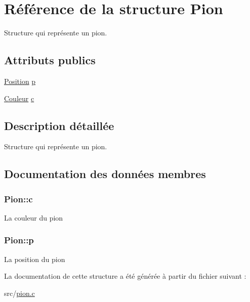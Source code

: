 \hypertarget{structPion}{\section{\-Référence de la structure \-Pion}
\label{structPion}
}


\-Structure qui représente un pion.  


\subsection*{\-Attributs publics}
\begin{DoxyCompactItemize}
\item 
\hyperlink{structPosition}{\-Position} \hyperlink{structPion_a1a131c2aae6a64827c7fcd6f52fcb47c}{p}
\item 
\hyperlink{couleur_8h_aa304d0ca681f782b1d7735da33037dd7}{\-Couleur} \hyperlink{structPion_a3811851abd3312e2e60a78fbc75081cb}{c}
\end{DoxyCompactItemize}


\subsection{\-Description détaillée}
\-Structure qui représente un pion. 

\subsection{\-Documentation des données membres}
\hypertarget{structPion_a3811851abd3312e2e60a78fbc75081cb}{
\subsubsection[{c}]{ {\bf \-Pion\-::c}}}\label{structPion_a3811851abd3312e2e60a78fbc75081cb}
\-La couleur du pion \hypertarget{structPion_a1a131c2aae6a64827c7fcd6f52fcb47c}{
\subsubsection[{p}]{ {\bf \-Pion\-::p}}}\label{structPion_a1a131c2aae6a64827c7fcd6f52fcb47c}
\-La position du pion 

\-La documentation de cette structure a été générée à partir du fichier suivant \-:\begin{DoxyCompactItemize}
\item 
src/\hyperlink{pion_8c}{pion.\-c}\end{DoxyCompactItemize}

